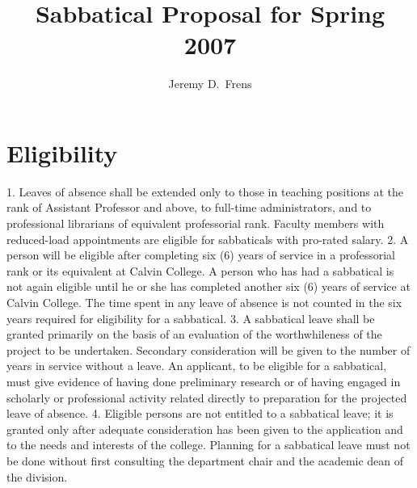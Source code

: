 \documentclass{article}
\title{Sabbatical Proposal for Spring 2007}
\author{Jeremy D.\ Frens}
\date{}
\begin{document}
\maketitle

\section*{Eligibility}

   1.  Leaves of absence shall be extended only to those in teaching positions at the rank of Assistant Professor and above, to full-time administrators, and to professional librarians of equivalent professorial rank. Faculty members with reduced-load appointments are eligible for sabbaticals with pro-rated salary.
   2. A person will be eligible after completing six (6) years of service in a professorial rank or its equivalent at Calvin College. A person who has had a sabbatical is not again eligible until he or she has completed another six (6) years of service at Calvin College. The time spent in any leave of absence is not counted in the six years required for eligibility for a sabbatical.
   3. A sabbatical leave shall be granted primarily on the basis of an evaluation of the worthwhileness of the project to be undertaken. Secondary consideration will be given to the number of years in service without a leave. An applicant, to be eligible for a sabbatical, must give evidence of having done preliminary research or of having engaged in scholarly or professional activity related directly to preparation for the projected leave of absence.
   4. Eligible persons are not entitled to a sabbatical leave; it is granted only after adequate consideration has been given to the application and to the needs and interests of the college. Planning for a sabbatical leave must not be done without first consulting the department chair and the academic dean of the division.
\end{document}
